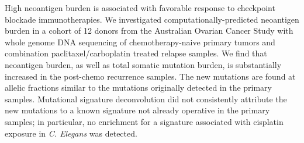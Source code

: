 High neoantigen burden is associated with favorable response to checkpoint blockade immunotherapies. We investigated computationally-predicted neoantigen burden in a cohort of 12 donors from the Australian Ovarian Cancer Study with whole genome DNA sequencing of chemotherapy-naive primary tumors and combination paclitaxel/carboplatin treated relapse samples. We find that neoantigen burden, as well as total somatic mutation burden, is substantially increased in the post-chemo recurrence samples. The new mutations are found at allelic fractions similar to the mutations originally detected in the primary samples. Mutational signature deconvolution did not consistently attribute the new mutations to a known signature not already operative in the primary samples; in particular, no enrichment for a signature associated with cisplatin exposure in \textit{C. Elegans} was detected.

